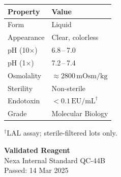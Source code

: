 \documentclass[10pt,a4paper]{article}
\begin{document}
\begin{minipage}[t]{0.36\linewidth}
  \begin{tcolorbox}[tealbox, title={\faCog\enskip Quick Specifications}]
    \small\color{NexaText}
    \renewcommand{\arraystretch}{1.35}
    \begin{tabular}{@{}p{2.4cm}@{\enspace}l@{}}
      \color{NexaTeal}\bfseries Property & \bfseries Value \\
      \midrule
      Form       & Liquid \\
      Appearance & Clear, colorless \\
      pH (10$\times$) & 6.8\,--\,7.0 \\
      pH (1$\times$)  & 7.2\,--\,7.4 \\
      Osmolality & $\approx 2800\,\text{mOsm/kg}$ \\
      Sterility  & Non-sterile\\
      Endotoxin  & $<\!0.1\,\text{EU/mL}^{\dagger}$ \\
      Grade      & Molecular Biology\\
    \end{tabular}

    \vspace{2mm}
    {\scriptsize $^{\dagger}$LAL assay; sterile-filtered lots only.}
  \end{tcolorbox}

  \vspace{3mm}

  \begin{tcolorbox}[greenbox]
    \centering
    {\color{NexaGreen}\faCheckCircle}\enskip
    {\small\bfseries\color{NexaGreen} Validated Reagent}\\[0.5mm]
    {\scriptsize\color{NexaText}
      Nexa Internal Standard QC-44B\\
      Passed: 14 Mar 2025}
  \end{tcolorbox}
\end{minipage}

\vspace{5mm}
\end{document}
